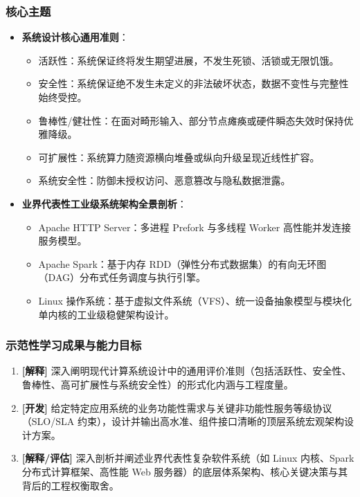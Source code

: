 \subsubsection{核心主题}
\begin{itemize}
    \item \textbf{系统设计核心通用准则}：
    \begin{itemize}
        \item 活跃性：系统保证终将发生期望进展，不发生死锁、活锁或无限饥饿。
        \item 安全性：系统保证绝不发生未定义的非法破坏状态，数据不变性与完整性始终受控。
        \item 鲁棒性/健壮性：在面对畸形输入、部分节点瘫痪或硬件瞬态失效时保持优雅降级。
        \item 可扩展性：系统算力随资源横向堆叠或纵向升级呈现近线性扩容。
        \item 系统安全性：防御未授权访问、恶意篡改与隐私数据泄露。
    \end{itemize}
    \item \textbf{业界代表性工业级系统架构全景剖析}：
    \begin{itemize}
        \item Apache HTTP Server：多进程 Prefork 与多线程 Worker 高性能并发连接服务模型。
        \item Apache Spark：基于内存 RDD（弹性分布式数据集）的有向无环图（DAG）分布式任务调度与执行引擎。
        \item Linux 操作系统：基于虚拟文件系统（VFS）、统一设备抽象模型与模块化单内核的工业级稳健架构设计。
    \end{itemize}
\end{itemize}

\subsubsection{示范性学习成果与能力目标}
\begin{enumerate}
    \item \textbf{[解释]} 深入阐明现代计算系统设计中的通用评价准则（包括活跃性、安全性、鲁棒性、高可扩展性与系统安全性）的形式化内涵与工程度量。
    \item \textbf{[开发]} 给定特定应用系统的业务功能性需求与关键非功能性服务等级协议（SLO/SLA 约束），设计并输出高水准、组件接口清晰的顶层系统宏观架构设计方案。
    \item \textbf{[解释/评估]} 深入剖析并阐述业界代表性复杂软件系统（如 Linux 内核、Spark 分布式计算框架、高性能 Web 服务器）的底层体系架构、核心关键决策与其背后的工程权衡取舍。
\end{enumerate}

